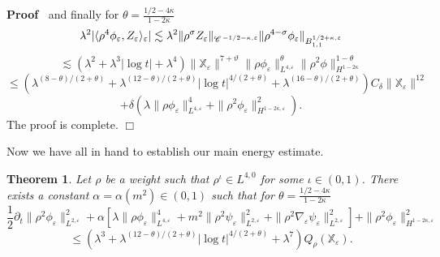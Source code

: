 \documentclass[a4paper,11pt]{article}
\newenvironment{proof}{\noindent\textbf{Proof\ }}{\hspace*{\fill}$\Box$\medskip}
\newtheorem{theorem}{Theorem}[section]
\numberwithin{equation}{section}
\newcommand{\CC}{\mathscr{C} \hspace{.1em}}
\begin{document}
\begin{proof}
  and finally for $\theta = \frac{1 / 2 - 4 \kappa}{1 - 2 \kappa}$
  \[ \lambda^2 | \langle \rho^4 \phi_{\varepsilon}, Z_{\varepsilon}
     \rangle_{\varepsilon} | \lesssim \lambda^2  \| \rho^{\sigma}
     Z_{\varepsilon} \|_{\CC^{- 1 / 2 - \kappa, \varepsilon}}  \| \rho^{4 -
     \sigma} \phi_{\varepsilon} \|_{B_{1, 1}^{1 / 2 + \kappa, \varepsilon}} \]
  \[ \lesssim (\lambda^2 + \lambda^3 | \log t| + \lambda^4)
     \|\mathbb{X}_{\varepsilon} \|^{7+\vartheta}  \| \rho \phi_{\varepsilon} \|_{L^{4,
     \varepsilon}}^{\theta}  \| \rho^2 \phi \|_{H^{1 - 2 \kappa}}^{1 - \theta}
  \]
 \[
   \leqslant (\lambda^{(8 - \theta) / (2 + \theta)} + \lambda^{(12 - \theta)
     / (2 + \theta)} | \log t|^{4 / (2 + \theta)} + \lambda^{(16 - \theta) /
     (2 + \theta)}) C_{\delta} \|\mathbb{X}_{\varepsilon} \|^{12} \]
   \begin{equation}\label{eq:Z0}
    + \delta (\lambda \| \rho \phi_{\varepsilon} \|_{L^{4, \varepsilon}}^4
     +\| \rho^2 \phi_{\varepsilon} \|_{H^{1 - 2 \kappa, \varepsilon}}^2) .
     \end{equation}
  The proof is complete.
\end{proof}


Now we have all in hand to establish our main energy estimate.

\begin{theorem}
  \label{th:energy-estimate}
  Let $\rho$ be a weight such that $\rho^{\iota} \in
  L^{4, 0}$ for some $\iota \in (0, 1)$. There exists a constant $\alpha=\alpha(m^{2}) \in (0,1)$  such that for    $\theta=\frac{1/2-4\kappa}{1-2\kappa}$
  \begin{equation}
    \frac{1}{2} \partial_t \| \rho^2 \phi_{\varepsilon} \|_{L^{2,
    \varepsilon}}^2 + \alpha [\lambda \| \rho \phi_{\varepsilon} \|_{L^{4,
    \varepsilon}}^4 +  m^2 \| \rho^2 \psi_{\varepsilon} \|_{L^{2,
    \varepsilon}}^2 +  \| \rho^2 \nabla_{\varepsilon} \psi_{\varepsilon}
    \|_{L^{2, \varepsilon}}^2] + \| \rho^2 \phi_{\varepsilon} \|_{H^{1 - 2
    \kappa, \varepsilon}}^2 \label{eq:d18}
  \end{equation}
  \[ \leqslant (\lambda^3 + \lambda^{(12 - \theta)
     / (2 + \theta)} | \log t|^{4 / (2 + \theta)} + \lambda^{7}) Q_{\rho} (\mathbb{X}_{\varepsilon}) . \]
\end{theorem}
\end{document}
